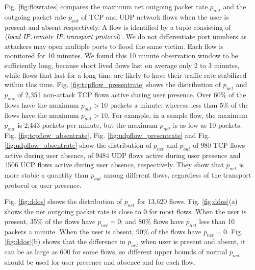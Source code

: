 Fig. \ref{fig:flowrates} compares the maximum net
outgoing packet rate $p_{net}$ and the outgoing packet rate
$p_{out}$ of TCP and UDP network flows when the user is present 
and absent respectively.  A flow is identified by a tuple consisting
of $\langle \mbox{\it local IP}, \mbox{\it remote IP}, 
\mbox{\it transport protocol} \rangle$.
We do not differentiate port numbers as attackers may open
multiple ports to flood the same victim. 
Each flow is monitored for 10 minutes. 
We found this 10 minute observation window to be sufficiently long, because short lived flows last on average only 2 to 3 minutes, 
while flows that last for a long time are likely to
have their traffic rate stabilized within this time.
Fig. \ref{fig:tcpflow_presentrate} shows the distribution of $p_{net}$ and $p_{out}$ of 2,351 non-attack TCP flows active during user presence.
Over 60\% of the flows have the maximum $p_{out}>10$ packets a
minute; whereas less than 5\% of the flows have the maximum
$p_{net}>10$. 
For example, in a sample flow, the maximum $p_{out}$ is 2,443 packets per
minute, but the maximum $p_{net}$ is as low as 10 packets. Fig. \ref{fig:tcpflow_absentrate}, Fig. \ref{fig:udpflow_presentrate} and Fig. \ref{fig:udpflow_absentrate} show the distribution of $p_{net}$ and $p_{out}$ of 980 TCP flows active during user absence, of 9484 UDP flows active during user presence and  1506 UCP flows active during user absence, respectively. They show that $p_{net}$ is more stable a quantity than $p_{out}$ among different flows, regardless of the transport protocol or user presence.

Fig. \ref{fig:ddos} shows the distribution of $p_{net}$ for 13,620 flows.
Fig. \ref{fig:ddos}(a) shows the net outgoing packet rate is close
to 0 for most flows. When the user is present, 35\% of the flows
have $p_{net}=0$; and 80\% flows have $p_{net}$ less than 10 packets
a minute. When the user is absent, 90\% of the flows have
$p_{net}=0$. Fig. \ref{fig:ddos}(b) shows that the difference in
$p_{net}$ when user is present and absent, it can be as large as 600
for some flows, so different upper bounds of normal $p_{net}$ should
be used for user presence and absence and for each flow.

